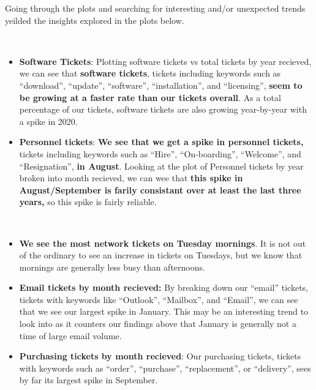 \documentclass[11pt]{article}
\begin{document}
    Going through the plots and searching for interesting and/or unexpected
trends yeilded the insights explored in the plots below.


    \begin{center}
    \end{center}
    { \hspace*{\fill} \\}
    
    \begin{itemize}
\item
  \textbf{Software Tickets}: Plotting software tickets vs total tickets
  by year recieved, we can see that \textbf{software tickets}, tickets
  including keywords such as ``download'', ``update'', ``software'',
  ``installation'', and ``licensing'', \textbf{seem to be growing at a
  faster rate than our tickets overall}. As a total percentage of our
  tickets, software tickets are also growing year-by-year with a spike
  in 2020.
\item
  \textbf{Personnel tickets}: \textbf{We see that we get a spike in
  personnel tickets,} tickets including keywords such as ``Hire'',
  ``On-boarding'', ``Welcome'', and ``Resignation'', \textbf{in August}.
  Looking at the plot of Personnel tickets by year broken into month
  recieved, we can wee that \textbf{this spike in August/September is
  farily consistant over at least the last three years,} so this spike
  is fairly reliable.
\end{itemize}

    \begin{center}
    \end{center}
    { \hspace*{\fill} \\}
    
    \begin{itemize}
\item
  \textbf{We see the most network tickets on Tuesday mornings}. It is
  not out of the ordinary to see an increase in tickets on Tuesdays, but
  we know that mornings are generally less busy than afternoons.
\item
  \textbf{Email tickets by month recieved:} By breaking down our
  ``email'' tickets, tickets with keywords like ``Outlook'',
  ``Mailbox'', and ``Email'', we can see that we see our largest spike
  in January. This may be an interesting trend to look into as it
  counters our findings above that January is generally not a time of
  large email volume.
\item
  \textbf{Purchasing tickets by month recieved}: Our purchasing tickets,
  tickets with keywords such as ``order'', ``purchase'',
  ``replacement'', or ``delivery'', sees by far its largest spike in
  September.
\end{itemize}
\end{document}
